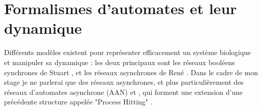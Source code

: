 \documentclass[10pt,a4paper]{article}
\begin{document}
\section{Formalismes d'automates et leur dynamique}
\label{fad}
Différents modèles existent pour représenter efficacement un système biologique et manipuler sa dynamique : les deux principaux sont les réseaux booléens synchrones de Stuart \cite{kauffman1969metabolic}, et les réseaux 
asynchrones de René \cite{thomas1973boolean}.
Dans le cadre de mon stage je ne parlerai que des réseaux asynchrones, et plus particulièrement des réseaux d'automates asynchrone (AAN) \cite{folschette2015sufficient} et \cite{pauleve2016pint}, qui forment une extension d'une 
précédente structure appelée "Process Hitting" \cite{pauleve14}.\\
\end{document}
